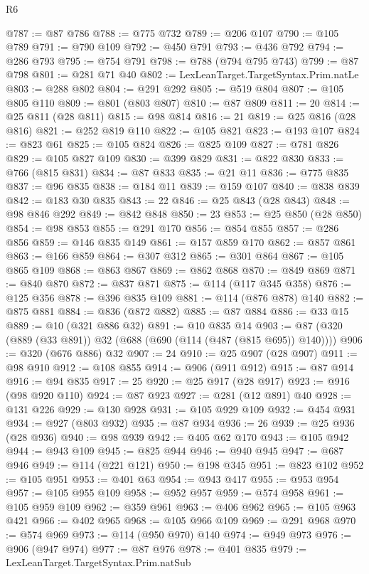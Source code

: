 \begin{lexlean}{R6}
\begin{coremodule}
@787 := @87 @786
@788 := @775 @732
@789 := @206 @107
@790 := @105 @789
@791 := @790 @109
@792 := @450 @791
@793 := @436 @792
@794 := @286 @793
@795 := @754 @791
@798 := @788 (@794 @795 @743)
@799 := @87 @798
@801 := @281 @71 @40
@802 := LexLeanTarget.TargetSyntax.Prim.natLe
@803 := @288 @802
@804 := @291 @292
@805 := @519 @804
@807 := @105 @805 @110
@809 := @801 (@803 @807)
@810 := @87 @809
@811 := 20
@814 := @25 @811 (@28 @811)
@815 := @98 @814
@816 := 21
@819 := @25 @816 (@28 @816)
@821 := @252 @819 @110
@822 := @105 @821
@823 := @193 @107
@824 := @823 @61
@825 := @105 @824
@826 := @825 @109
@827 := @781 @826
@829 := @105 @827 @109
@830 := @399 @829
@831 := @822 @830
@833 := @766 (@815 @831)
@834 := @87 @833
@835 := @21 @11
@836 := @775 @835
@837 := @96 @835
@838 := @184 @11
@839 := @159 @107
@840 := @838 @839
@842 := @183 @30 @835
@843 := 22
@846 := @25 @843 (@28 @843)
@848 := @98 @846 @292
@849 := @842 @848
@850 := 23
@853 := @25 @850 (@28 @850)
@854 := @98 @853
@855 := @291 @170
@856 := @854 @855
@857 := @286 @856
@859 := @146 @835 @149
@861 := @157 @859 @170
@862 := @857 @861
@863 := @166 @859
@864 := @307 @312
@865 := @301 @864
@867 := @105 @865 @109
@868 := @863 @867
@869 := @862 @868
@870 := @849 @869
@871 := @840 @870
@872 := @837 @871
@875 := @114 (@117 @345 @358)
@876 := @125 @356
@878 := @396 @835 @109
@881 := @114 (@876 @878) @140
@882 := @875 @881
@884 := @836 (@872 @882)
@885 := @87 @884
@886 := @33 @15
@889 := @10 (@321 @886 @32)
@891 := @10 @835 @14
@903 := @87 (@320 (@889 (@33 @891)) @32 (@688 (@690 (@114 (@487 (@815 @695)) @140))))
@906 := @320 (@676 @886) @32
@907 := 24
@910 := @25 @907 (@28 @907)
@911 := @98 @910
@912 := @108 @855
@914 := @906 (@911 @912)
@915 := @87 @914
@916 := @94 @835
@917 := 25
@920 := @25 @917 (@28 @917)
@923 := @916 (@98 @920 @110)
@924 := @87 @923
@927 := @281 (@12 @891) @40
@928 := @131 @226
@929 := @130 @928
@931 := @105 @929 @109
@932 := @454 @931
@934 := @927 (@803 @932)
@935 := @87 @934
@936 := 26
@939 := @25 @936 (@28 @936)
@940 := @98 @939
@942 := @405 @62 @170
@943 := @105 @942
@944 := @943 @109
@945 := @825 @944
@946 := @940 @945
@947 := @687 @946
@949 := @114 (@221 @121)
@950 := @198 @345
@951 := @823 @102
@952 := @105 @951
@953 := @401 @63
@954 := @943 @417
@955 := @953 @954
@957 := @105 @955 @109
@958 := @952 @957
@959 := @574 @958
@961 := @105 @959 @109
@962 := @359 @961
@963 := @406 @962
@965 := @105 @963 @421
@966 := @402 @965
@968 := @105 @966 @109
@969 := @291 @968
@970 := @574 @969
@973 := @114 (@950 @970) @140
@974 := @949 @973
@976 := @906 (@947 @974)
@977 := @87 @976
@978 := @401 @835
@979 := LexLeanTarget.TargetSyntax.Prim.natSub

\end{coremodule}
\end{lexlean}

